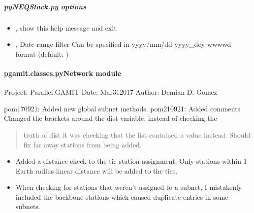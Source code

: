 \documentclass[letterpaper,10pt,english]{sphinxmanual}
\begin{document}
\subparagraph{pyNEQStack.py options}
\label{\detokenize{pgamit.classes:pyNEQStack.py-options}}\begin{itemize}
\item {} 
\sphinxAtStartPar
{\hyperref[\detokenize{pgamit.classes:pyNEQStack.py--h}]{}}, {\hyperref[\detokenize{pgamit.classes:pyNEQStack.py---help}]{}} \sphinxhyphen{} show this help message and exit

\item {} 
\sphinxAtStartPar
{\hyperref[\detokenize{pgamit.classes:pyNEQStack.py--d}]{}} , {\hyperref[\detokenize{pgamit.classes:pyNEQStack.py---date_filter}]{}}  \sphinxhyphen{} Date range filter Can be specified in yyyy/mm/dd yyyy\_doy  wwww\sphinxhyphen{}d format (default: )

\end{itemize}


\paragraph{pgamit.classes.pyNetwork module}
\label{\detokenize{pgamit.classes:module-pgamit.classes.pyNetwork}}\label{\detokenize{pgamit.classes:pgamit-classes-pynetwork-module}}
\sphinxAtStartPar
Project: Parallel.GAMIT
Date: Mar\sphinxhyphen{}31\sphinxhyphen{}2017
Author: Demian D. Gomez

\sphinxAtStartPar
pom170921: Added new global subnet methods.
pom210921:
\sphinxhyphen{} Added comments
\sphinxhyphen{} Changed the brackets around the dist variable, instead of checking the
\begin{quote}

\sphinxAtStartPar
truth of dist it was checking that the list contained a value instead.
Should fix far away stations from being added.
\end{quote}
\begin{itemize}
\item {} 
\sphinxAtStartPar
Added a distance check to the tie station assignment. Only stations
within 1 Earth radius linear distance will be added to the ties.

\item {} 
\sphinxAtStartPar
When checking for stations that weren’t assigned to a subnet, I mistakenly
included the backbone stations which caused duplicate entries in some
subnets.

\end{itemize}
\end{document}
